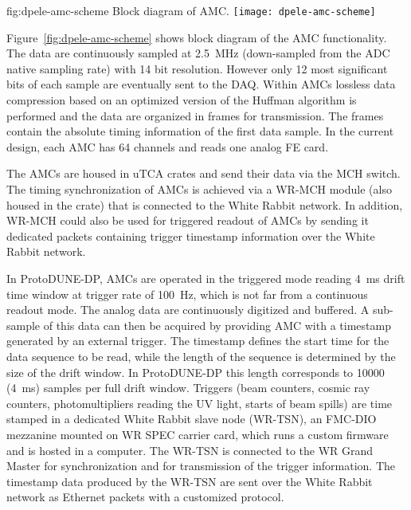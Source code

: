 \begin{dunefigure}{fig:dpele-amc-scheme}
{Block diagram of AMC.}
\texttt{[image: dpele-amc-scheme]}
\end{dunefigure}

Figure~\ref{fig:dpele-amc-scheme} shows block diagram of the AMC functionality. The data are continuously sampled at \SI{2.5}{\MHz} (down-sampled from the ADC native sampling rate) with \num{14} bit resolution. However only \num{12} most significant bits of each sample are eventually sent to the DAQ. Within AMCs lossless data compression based on an optimized version of the Huffman algorithm is performed and the data are organized in frames for transmission. The frames contain the absolute timing information of the first data sample.  In the current design, each AMC has 64 channels and reads one analog FE card.

The AMCs are housed in uTCA crates and send their data via the MCH switch. The timing synchronization of AMCs is achieved via a WR-MCH module (also housed in the crate) that is connected to the White Rabbit network. In addition, WR-MCH could also be used for triggered readout of AMCs by sending it dedicated packets containing trigger timestamp information over the White Rabbit network.

In ProtoDUNE-DP, AMCs are operated in the triggered mode reading \SI{4}{\milli\second} drift time window at trigger rate of \SI{100}{Hz}, which is not far from a continuous readout mode. The analog data are continuously digitized and buffered. A sub-sample of this data can then be acquired by providing AMC with a timestamp generated by an external trigger. The timestamp defines the start time for the data sequence to be read, while the length of the sequence is determined by the size of the drift window. In ProtoDUNE-DP this length corresponds to \num{10000} (\SI{4}{\milli\second}) samples per full drift window.  Triggers (beam counters, cosmic ray counters, photomultipliers reading the UV light, starts of beam spills) are time stamped in a dedicated White Rabbit slave node (WR-TSN), an FMC-DIO mezzanine mounted on WR SPEC carrier card, which runs a custom firmware and is hosted in a computer. The WR-TSN is connected to the WR Grand Master for synchronization and for transmission of the trigger information. The timestamp data produced by the WR-TSN are sent over the White Rabbit network as Ethernet packets with a customized protocol. 

